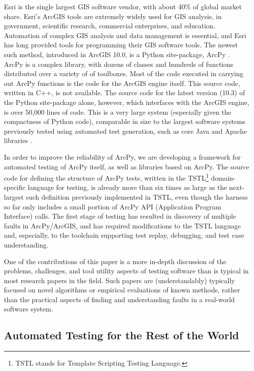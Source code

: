 Esri is the single largest GIS software vendor, with about 40\% of
global market share.  Esri's ArcGIS tools are extremely widely used
for GIS analysis, in government, scientific research, commercial
enterprises, and education.  Automation of complex GIS analysis and
data management is essential, and Esri has long provided tools for
programming their GIS software tools.  The newest such method,
introduced in ArcGIS 10.0, is a Python site-package, ArcPy
\cite{ArcPy}.  ArcPy is a complex library, with dozens of classes and
hundreds of functions distributed over a variety of of toolboxes.
Most of the code executed in carrying out ArcPy functions is the code
for the ArcGIS engine itself.  This source code, written in C++, is
not available.  The source code for the latest version (10.3) of the
Python site-package alone, however, which interfaces with the ArcGIS
engine, is over 50,000 lines of code.  This is a very large system
(especially given the compactness of Python code), comparable in size
to the largest software systems previously tested using automated test
generation, such as core Java and Apache libraries
\cite{FA11,Pacheco}.

In order to improve the reliability of ArcPy, we are developing a
framework for automated testing of ArcPy itself, as well as libraries
based on ArcPy.  The source code for defining the structure of ArcPy
tests, written in the TSTL\footnote{TSTL stands for Template Scripting
  Testing Language.}\cite{NFM15,ISSTA14,tstl} domain-specific
language \cite{Fow10} for testing, is already more than six times as
large as the next-largest such definition previously implemented in
TSTL, even though the harness so far only includes a small portion of ArcPy
API (Application Program Interface) calls. The first stage of testing has resulted in discovery of
multiple faults in ArcPy/ArcGIS, and has required modifications to the
TSTL language and, especially, to the toolchain supporting test replay,
debugging, and test case understanding.

One of the contributions of this paper is a more in-depth discussion
of the problems, challenges, and tool utility aspects of testing
software than is typical in most research papers in the field.  Such
papers are (understandably) typically focused on novel algorithms or
empirical evaluations of known methods, rather than the practical aspects of finding
and understanding faults in a real-world software system.


\subsection{Automated Testing for the Rest of the World}

